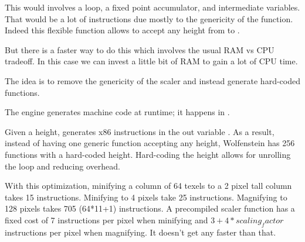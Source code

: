 \par
\begin{minipage}{\textwidth}

\end{minipage}

\par
This would involves a loop, a fixed point accumulator, and intermediate variables. That would be a lot of instructions due mostly to the genericity of the function. Indeed this flexible function allows  to accept any height from  to .\\
\par
 But there is a faster way to do this which involves the usual RAM vs CPU tradeoff. In this case we can invest a little bit of RAM to gain a lot of CPU time.\\
 \par 
 The idea is to remove the genericity of the scaler and instead generate hard-coded functions.\\
\par
\begin{minipage}{\textwidth}

\end{minipage}

 The engine generates machine code at runtime; it happens in .\\
 
\par
\begin{minipage}{\textwidth}

\end{minipage}
\par
Given a height,  generates x86 instructions in the out variable . As a result, instead of having one generic function accepting any height,  Wolfenstein has 256 functions with a hard-coded height. Hard-coding the height allows for unrolling the loop and reducing overhead.\\
\par
With this optimization, minifying a column of 64 texels to a 2 pixel tall column takes 15 instructions. Minifying to 4 pixels take 25 instructions. Magnifying to 128 pixels takes 705 (64*11+1) instructions. A precompiled scaler function has a fixed cost of 7 instructions per pixel when minifying and $3+4*scaling_factor$ instructions per pixel when magnifying. It doesn't get any faster than that.\\

